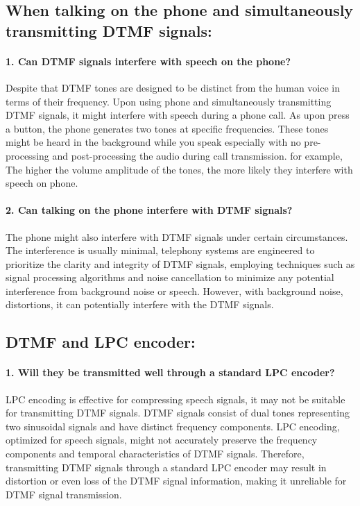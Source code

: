 \documentclass[letterpaper, 12pt]{article}
\begin{document}
\subsection{When talking on the phone and simultaneously transmitting DTMF signals:} 
\paragraph{1. Can DTMF signals interfere with speech on the phone?\\} 
Despite that DTMF tones are designed to be distinct from the human voice in terms of their frequency. Upon using phone and simultaneously transmitting DTMF signals, it might interfere with speech during a phone call. As upon press a button, the phone generates two tones at specific frequencies. These tones might be heard in the background while you speak especially with no pre-processing and post-processing the audio during call transmission. for example, The higher the volume amplitude of the tones, the more likely they interfere with speech on phone.

\paragraph{2. Can talking on the phone interfere with DTMF signals?\\} 
The phone might also interfere with DTMF signals under certain circumstances. The interference is usually minimal, telephony systems are engineered to prioritize the clarity and integrity of DTMF signals, employing techniques such as signal processing algorithms and noise cancellation to minimize any potential interference from background noise or speech. However, with background noise, distortions, it can potentially interfere with the DTMF signals.

\subsection{DTMF and LPC encoder:} 
\paragraph{1. Will they be transmitted well through a standard LPC encoder?} 
LPC encoding is effective for compressing speech signals, it may not be suitable for transmitting DTMF signals. DTMF signals consist of dual tones representing two sinusoidal signals and have distinct frequency components. LPC encoding, optimized for speech signals, might not accurately preserve the frequency components and temporal characteristics of DTMF signals. Therefore, transmitting DTMF signals through a standard LPC encoder may result in distortion or even loss of the DTMF signal information, making it unreliable for DTMF signal transmission.
\end{document}
